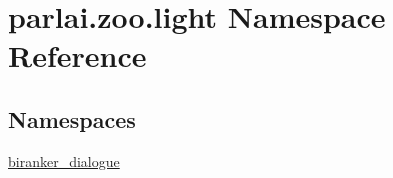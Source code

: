 \hypertarget{namespaceparlai_1_1zoo_1_1light}{}\section{parlai.\+zoo.\+light Namespace Reference}
\label{namespaceparlai_1_1zoo_1_1light}
\subsection*{Namespaces}
\begin{DoxyCompactItemize}
\item 
 \hyperlink{namespaceparlai_1_1zoo_1_1light_1_1biranker__dialogue}{biranker\+\_\+dialogue}
\end{DoxyCompactItemize}
